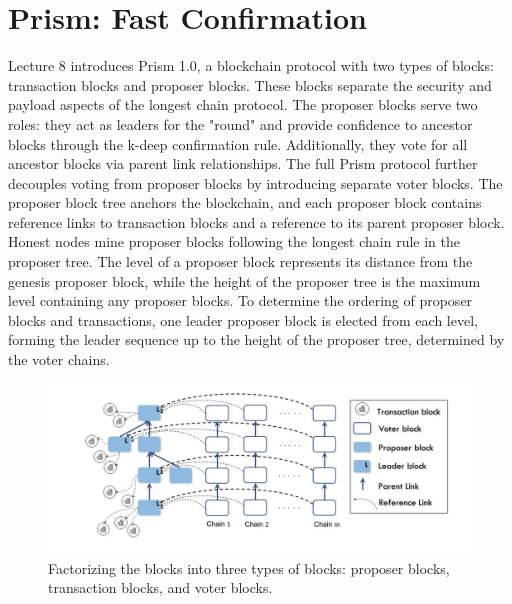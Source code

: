 \section{Prism: Fast Confirmation}
Lecture 8 introduces Prism 1.0, a blockchain protocol with two types of blocks: transaction blocks and proposer blocks. These blocks separate the security and payload aspects of the longest chain protocol. The proposer blocks serve two roles: they act as leaders for the "round" and provide confidence to ancestor blocks through the k-deep confirmation rule. Additionally, they vote for all ancestor blocks via parent link relationships. The full Prism protocol further decouples voting from proposer blocks by introducing separate voter blocks. The proposer block tree anchors the blockchain, and each proposer block contains reference links to transaction blocks and a reference to its parent proposer block. Honest nodes mine proposer blocks following the longest chain rule in the proposer tree. The level of a proposer block represents its distance from the genesis proposer block, while the height of the proposer tree is the maximum level containing any proposer blocks. To determine the ordering of proposer blocks and transactions, one leader proposer block is elected from each level, forming the leader sequence up to the height of the proposer tree, determined by the voter chains.
\begin{center}
    \begin{figure}
        \centering
        \includegraphics[width=0.8\linewidth]{Fig/09/F3}
        \caption{Factorizing the blocks into three types of blocks: proposer blocks, transaction blocks, and voter blocks.}
        \label{fig:f3}
    \end{figure}
\end{center}
